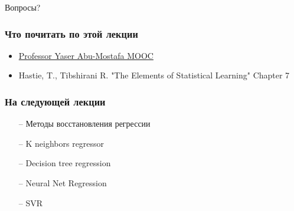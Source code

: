 \documentclass[10pt]{beamer}
\begin{document}
\begin{frame}[standout]
  Вопросы?
\end{frame}

\appendix

\begin{frame}\frametitle{Что почитать по этой лекции}
  \begin{itemize}
    \item \href{http://work.caltech.edu/telecourse.html}{Professor Yaser Abu-Mostafa MOOC}
    \item  Hastie, T., Tibshirani R. "The Elements of Statistical Learning" Chapter 7 
  \end{itemize}
\end{frame}

\begin{frame}\frametitle{На следующей лекции}
	\begin{itemize}
    	\item[--] Методы восстановления регрессии
    	\item[--] K neighbors regressor 	    	
    	\item[--] Decision tree regression 
    	\item[--] Neural Net Regression
    	\item[--] SVR
	\end{itemize}
\end{frame}
\end{document}
